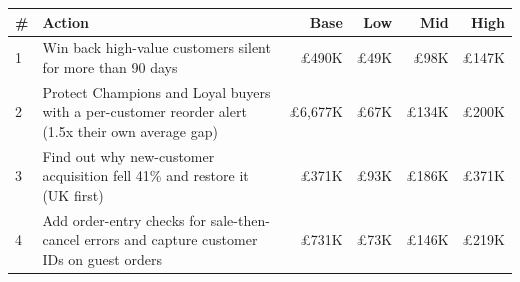 \begin{tabularx}{\textwidth}{lXrrrr}
\toprule
\# & Action & Base & Low & Mid & High \\
\midrule
1 & Win back high-value customers silent for more than 90 days & \pounds{}490K & \pounds{}49K & \pounds{}98K & \pounds{}147K \\
2 & Protect Champions and Loyal buyers with a per-customer reorder alert (1.5x their own average gap) & \pounds{}6,677K & \pounds{}67K & \pounds{}134K & \pounds{}200K \\
3 & Find out why new-customer acquisition fell 41\% and restore it (UK first) & \pounds{}371K & \pounds{}93K & \pounds{}186K & \pounds{}371K \\
4 & Add order-entry checks for sale-then-cancel errors and capture customer IDs on guest orders & \pounds{}731K & \pounds{}73K & \pounds{}146K & \pounds{}219K \\
\bottomrule
\end{tabularx}
